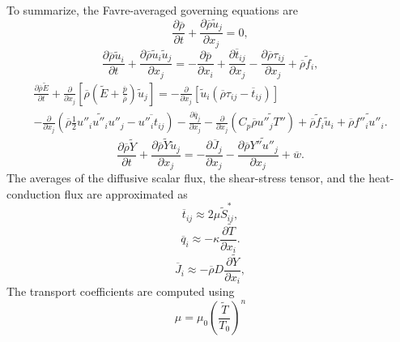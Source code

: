 \documentclass[oneside,a4paper,11pt]{report}
\newcommand{\rhoavg}{\overline{\rho}}
\newcommand{\pavg}{\overline{p}}
\newcommand{\qavg}{\overline{q}}
\newcommand{\tavg}{\overline{t}}
\newcommand{\wavg}{\overline{w}}
\newcommand{\Javg}{\overline{J}}
\newcommand{\rs}{\tau}          %
\newcommand{\favgf}{\widetilde{f}}
\newcommand{\uavgf}{\widetilde{u}}
\newcommand{\Eavgf}{\widetilde{E}}
\newcommand{\Tavgf}{\widetilde{T}}
\newcommand{\Yavgf}{\widetilde{Y}}
\newcommand{\Savgf}{\widetilde{S}}
\newcommand{\fflucf}{f''}
\newcommand{\Yflucf}{Y''}
\newcommand{\Tflucf}{T''}
\newcommand{\uflucf}{u''}
\begin{document}
To summarize, the Favre-averaged governing equations are
\begin{equation}
\label{eq:favre_rho}
\frac{\partial \rhoavg}{\partial t} + \frac{\partial \rhoavg \uavgf_j}{\partial x_j} = 0,
\end{equation}
\begin{equation}
\label{eq:favre_vel}
\frac{\partial \rhoavg \uavgf_i}{\partial t} + \frac{\partial \rhoavg \uavgf_i \uavgf_j}{\partial x_j} = -\frac{\partial \pavg}{\partial x_i} + \frac{\partial \tavg_{ij}}{\partial x_j} - \frac{\partial \rhoavg \rs_{ij} }{\partial x_j} + \rhoavg \favgf_i,
\end{equation}
\begin{multline}
\label{eq:favre_energy}
\frac{\partial \rhoavg \Eavgf}{\partial t} + \frac{\partial}{\partial x_j} \left [ \rhoavg \left ( \Eavgf + \frac{ \pavg}{ \rhoavg} \right ) \uavgf_j \right ] = - \frac{\partial}{\partial x_j} \left [ \uavgf_i \left ( \rhoavg \rs_{ij} - \tavg_{ij} \right ) \right ] \\
- \frac{ \partial }{\partial x_j} \left ( \rhoavg \frac{1}{2} \widetilde{ \uflucf_i \uflucf_i \uflucf_j } - \overline{ \uflucf_i t_{ij} } \right ) - \frac{\partial \qavg_j}{\partial x_j} - \frac{\partial}{\partial x_j} \left ( C_p \rhoavg \widetilde{ \uflucf_j \Tflucf } \right ) + \rhoavg \favgf_i \uavgf_i + \rhoavg \widetilde{ \fflucf_i \uflucf_i }.
\end{multline}
\begin{equation}
    \label{eq:favre_scalar}
    \frac{\partial \rhoavg \Yavgf}{\partial t} + \frac{\partial \rhoavg \Yavgf \uavgf_j}{\partial x_j} = -\frac{\partial \Javg_j}{\partial x_j} - \frac{\partial \rhoavg \widetilde{\Yflucf \uflucf_j}}{\partial x_j} + \wavg.    
\end{equation}
The averages of the diffusive scalar flux, the shear-stress tensor, and the heat-conduction flux are approximated as
\begin{equation}
    \label{eq:shear_stress_model}
    \tavg_{ij} \approx 2 \mu \Savgf^*_{ij},
\end{equation}
\begin{equation}
    \qavg_i \approx -\kappa \frac{ \partial \Tavgf }{ \partial x_i }.
\end{equation}
\begin{equation}
    \Javg_i \approx - \rhoavg D \frac{\partial \Yavgf}{\partial x_i},
\end{equation}
The transport coefficients are computed using
\begin{equation}
    \mu = \mu_0 \left ( \frac{\Tavgf}{T_0} \right )^n
\end{equation}
\end{document}
